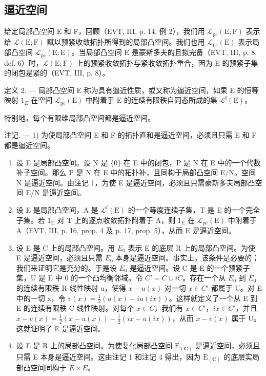 \subsection{逼近空间}

给定局部凸空间 E 和 F，回顾（EVT, III, p. 14, 例 2），我们用 \(\mathcal{L}_{\mathrm{pc}}(\mathrm{E};\mathrm{F})\) 表示给 \(\mathcal{L}(\mathrm{E};\mathrm{F})\) 赋以预紧收敛拓扑所得到的局部凸空间。我们也用 \(\mathcal{L}_{\mathrm{pc}}(\mathrm{E})\) 表示局部凸空间 \(\mathcal{L}_{\mathrm{pc}}(\mathrm{E};\mathrm{E})\)。当局部凸空间 E 是豪斯多夫的且拟完备（EVT, III, p. 8, def. 6）时，\(\mathcal{L}(\mathrm{E};\mathrm{F})\) 上的预紧收敛拓扑与紧收敛拓扑重合，因为 E 的预紧子集的闭包是紧的（EVT, III, p. 8）。

定义 2. --- 局部凸空间 E 称为具有逼近性质，或又称为逼近空间，如果 E 的恒等映射 \(1_{E}\) 在空间 \(\mathcal{L}_{\mathrm{pc}}(\mathrm{E})\) 中附着于 E 的连续有限秩自同态所成的集 \(\mathcal{L}^{\mathrm{f}}(\mathrm{E})\)。

特别地，每个有限维局部凸空间都是逼近空间。

注记. --- 1) 为使局部凸空间 E 和 F 的拓扑直和是逼近空间，必须且只需 E 和 F 都是逼近空间。

\begin{enumerate}
\def\labelenumi{\arabic{enumi})}
\setcounter{enumi}{1}
\item
  设 E 是局部凸空间。设 N 是 \(\{0\}\) 在 E 中的闭包，P 是 N 在 E 中的一个代数补子空间。那么 P 是 N 在 E 中的拓扑补，且同构于局部凸空间 E/N。空间 N 是逼近空间。由注记 1，为使 E 是逼近空间，必须且只需豪斯多夫局部凸空间 E/N 是逼近空间。
\item
  设 E 是局部凸空间，A 是 \(\mathcal{L}^{\mathrm{f}}(\mathrm{E})\) 的一个等度连续子集，T 是 E 的一个完全子集。若 \(1_{\mathrm{E}}\) 对 T 上的逐点收敛拓扑附着于 A，则 \(1_{\mathrm{E}}\) 在 \(\mathcal{L}_{\mathrm{pc}}(\mathrm{E})\) 中附着于 A（EVT, III, p. 16, prop. 4 及 p. 17, prop. 5），从而 E 是逼近空间。
\item
  设 E 是 C 上的局部凸空间。用 \(E_{0}\) 表示 E 的底层 R 上的局部凸空间。为使 E 是逼近空间，必须且只需 \(E_{0}\) 本身是逼近空间。事实上，该条件是必要的；我们来证明它是充分的。于是设 \(E_{0}\) 是逼近空间。设 C 是 E 的一个预紧子集，U 是 E 中 0 的一个凸均衡邻域。令 \(C' = C \cup iC\)。存在一个从 \(E_{0}\) 到 \(E_{0}\) 的连续有限秩 R-线性映射 u，使得 \(x - u(x)\) 对一切 \(x \in C'\) 都属于 U。对 E 中的一切 x，令 \(v(x) = \frac{1}{2}(u(x) - iu(ix))\)。这样就定义了一个从 E 到 E 的连续有限秩 C-线性映射。对每个 \(x \in C\)，我们有 \(x \in C'\)，\(ix \in C'\)，并且 \(x - v(x) = \frac{1}{2}(x - u(x)) - \frac{i}{2}(ix - u(ix))\)，从而 \(x - v(x)\) 属于 U。这就证明了 E 是逼近空间。
\item
  设 E 是 R 上的局部凸空间。为使复化局部凸空间 \(\mathrm{E}_{(\mathbf{C})}\) 是逼近空间，必须且只需 E 本身是逼近空间。这由注记 1 和注记 4 得出，因为 \(\mathrm{E}_{(\mathbf{C})}\) 的底层实局部凸空间同构于 \(E \times E\)。
\end{enumerate}

